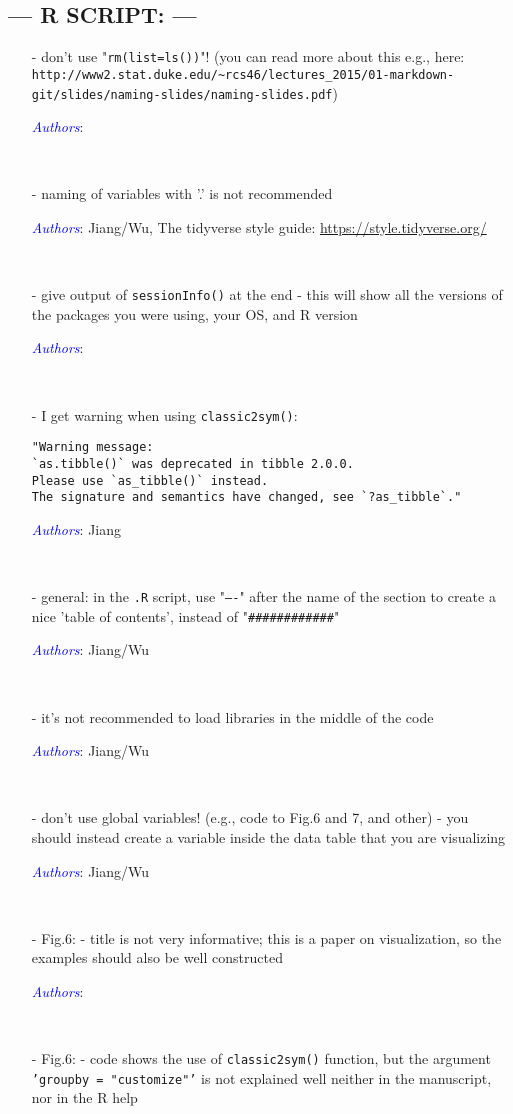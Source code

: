 \documentclass[11pt]{article}
\newcommand{\authors}[1]{

 \parbox{15cm}{\textcolor{blue}{\it Authors}: \color{red}#1}
 \\ \vspace{0.3cm}
}
\begin{document}
\subsection*{--- R SCRIPT: ---}
\begin{itemize}
\item[-] don't use "{\tt rm(list=ls())}"! (you can read more about this e.g., here: \verb|http://www2.stat.duke.edu/~rcs46/lectures_2015/01-markdown-git/slides/naming-slides/naming-slides.pdf|)
\authors{}


\item[-] naming of variables with '.' is not recommended
\authors{Jiang/Wu, The tidyverse style guide: \url{https://style.tidyverse.org/}}


\item[-] give output of {\tt sessionInfo()} at the end - this will show all the versions of the packages you were using, your OS, and R version
\authors{}


\item[-] I get warning when using {\tt classic2sym()}:
\begin{verbatim}
"Warning message:
`as.tibble()` was deprecated in tibble 2.0.0.
Please use `as_tibble()` instead.
The signature and semantics have changed, see `?as_tibble`."
\end{verbatim}
\authors{Jiang}




\item[-] general: in the {\tt .R} script, use "{\tt ----}" after the name of the section to create a nice 'table of contents', instead of "\verb|############|"
\authors{Jiang/Wu}


\item[-] it's not recommended to load libraries in the middle of the code
\authors{Jiang/Wu}


\item[-] don't use global variables! (e.g., code to Fig.6 and 7, and other) - you should instead create a variable inside the data table that you are visualizing
\authors{Jiang/Wu}



\item[-] Fig.6:  - title is not very informative; this is a paper on visualization, so the examples should also be well constructed
\authors{}

\item[-] Fig.6: - code shows the use of {\tt classic2sym()} function, but the argument {\tt 'groupby = "customize"'} is not explained well neither in the manuscript, nor in the R help


\end{itemize}
\end{document}
